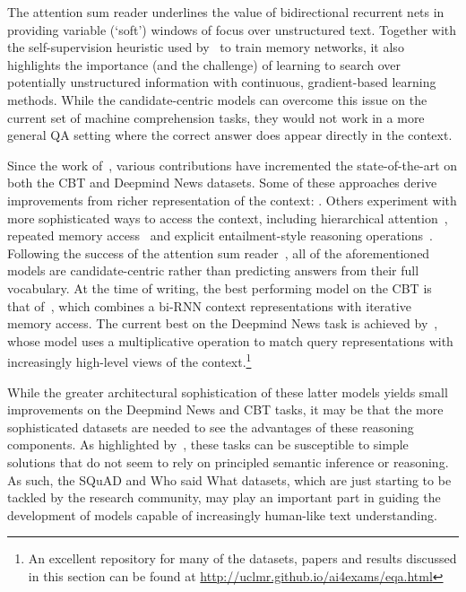 \documentclass[11pt,letterpaper]{article}
\begin{document}
The attention sum reader underlines the value of bidirectional recurrent nets in providing variable (`soft') windows of focus over unstructured text. Together with the self-supervision heuristic used by~ to train memory networks, it also highlights the importance (and the challenge) of learning to search over potentially unstructured information with continuous, gradient-based learning methods. While the candidate-centric models can overcome this issue on the current set of machine comprehension tasks, they would not work in a more general QA setting where the correct answer does appear directly in the context. 

Since the work of~, various contributions have incremented the state-of-the-art on both the CBT and Deepmind News datasets. Some of these approaches derive improvements from richer representation of the context:  \cite{kobayashi2016dynamic,weissenborn2016separating,sordoni2016iterative}. Others experiment with more sophisticated ways to access the context, including hierarchical attention~\cite{cui2016attention}, repeated memory access~\cite{cui2016attention,weissenborn2016separating,dhingra2016gated,sordoni2016iterative} and explicit entailment-style reasoning operations~\cite{trischler2016natural}. Following the success of the attention sum reader~,  all of the aforementioned models are candidate-centric rather than predicting answers from their full vocabulary. At the time of writing, the best performing model on the CBT is that of~\cite{sordoni2016iterative}, which combines a bi-RNN context representations with iterative memory access. The current best on the Deepmind News task is achieved by~, whose model uses a multiplicative operation to match query representations with increasingly high-level views of the context.\footnote{An excellent repository for many of the datasets, papers and results discussed in this section can be found at \url{http://uclmr.github.io/ai4exams/eqa.html}}

While the greater architectural sophistication of these latter models yields small improvements on the Deepmind News and CBT tasks, it may be that the more sophisticated datasets are needed to see the advantages of these reasoning components. As highlighted by~, these tasks can be susceptible to simple solutions that do not seem to rely on principled semantic inference or reasoning. As such, the SQuAD and Who said What datasets, which are just starting to be tackled by the research community, may play an important part in guiding the development of models capable of increasingly human-like text understanding.
\end{document}
